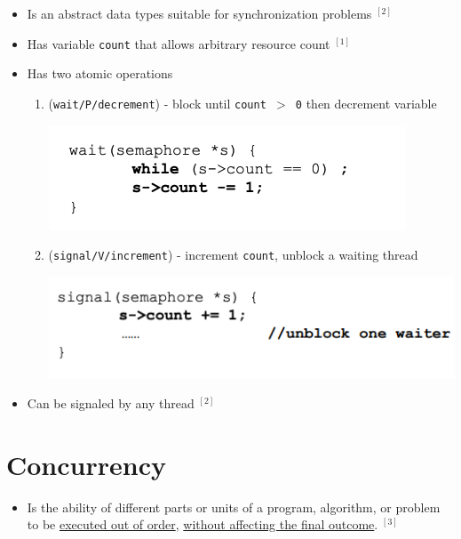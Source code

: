 \documentclass[12pt]{article}
\begin{document}
\begin{itemize}
    \item Is an abstract data types suitable for synchronization problems $^{[2]}$
    \item Has variable \texttt{count} that allows arbitrary resource count $^{[1]}$
    \item Has two atomic operations

    \begin{enumerate}[1.]
        \item (\texttt{wait/P/decrement}) - block until \texttt{count $>$ 0} then decrement variable

        \begin{center}
        \includegraphics[width=0.7\linewidth]{images/midterm_1_solution_2.png}
        \end{center}

        \item (\texttt{signal/V/increment}) - increment \texttt{count}, unblock a waiting thread

        \begin{center}
        \includegraphics[width=0.7\linewidth]{images/midterm_1_solution_3.png}
        \end{center}
    \end{enumerate}

    \item Can be signaled by any thread $^{[2]}$
\end{itemize}


\section*{Concurrency}

\begin{itemize}
    \item Is the ability of different parts or units of a program, algorithm,
    or problem to be \underline{executed out of order}, \underline{without affecting the final
    outcome}. $^{[3]}$
\end{itemize}
\end{document}
